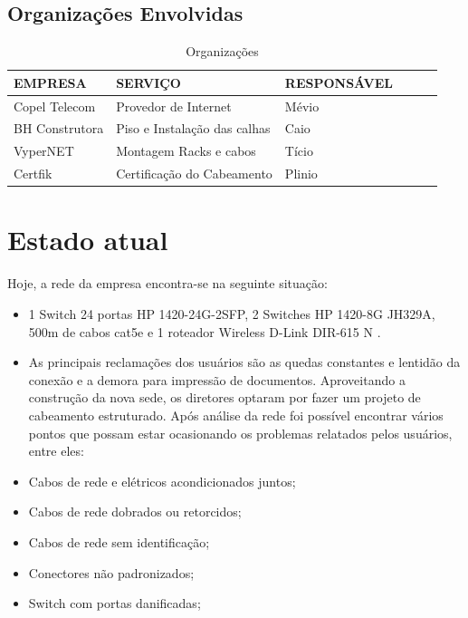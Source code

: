 \documentclass[	DIV=calc,%
paper=a4,%
fontsize=12pt,%
onecolumn]{scrartcl}	 					%
\begin{document}
	\subsection{Organizações Envolvidas}
	\begin{table}[h!] %
		\centering
		\caption{Organizações}
		\label{tab1} %
		\begin{tabular}{llllll}
			\toprule
			{\textbf{EMPRESA}} & {\textbf{SERVIÇO}} & {\textbf{RESPONSÁVEL}} \\
			\midrule 
			Copel Telecom  & Provedor de Internet          & Mévio \\ 		
			BH Construtora & Piso e Instalação das calhas  & Caio\\ 
			VyperNET       & Montagem Racks e cabos        & Tício \\ 
			Certfik       & Certificação do Cabeamento     & Plinio \\
			\bottomrule
		\end{tabular}
	\end{table}
	
	
	
	\section{Estado atual}
	Hoje, a rede da empresa encontra-se na seguinte situação:
	\begin{itemize}
		\item 1 Switch 24 portas HP 1420-24G-2SFP, 2 Switches HP 1420-8G JH329A, 500m de cabos cat5e e 1 roteador Wireless D-Link DIR-615 N .
		\item As principais reclamações dos usuários são as quedas constantes e lentidão da conexão e a demora para impressão de documentos. Aproveitando a construção da nova sede, os diretores optaram por fazer um projeto de cabeamento estruturado.
	Após análise da rede foi possível encontrar vários pontos que possam estar ocasionando os problemas relatados pelos usuários, entre eles:
		\item Cabos de rede e elétricos acondicionados juntos;
		\item Cabos de rede dobrados ou retorcidos;
		\item Cabos de rede sem identificação;		
		\item Conectores não padronizados;
		\item Switch com portas danificadas;
	\end{itemize}
	
\end{document}
